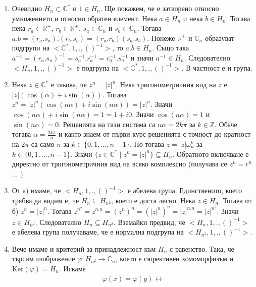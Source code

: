 \documentclass[12pt]{article}
\begin{document}
\begin{enumerate}[label=\alph*)]
    \item Очевидно \(H_n \subset \mathbb{C}^*\) и \(1 \in H_n\).
    Ще покажем, че е затворено относно умножението и относно обратен елемент.
    Нека \(a \in H_n\) и нека \(b \in H_n\). Тогава нека \(r_a \in \mathbb{R}^+\),
    \(r_b \in \mathbb{R}^+\), \(s_a \in \mathbb{C}_n\) и \(s_b \in \mathbb{C}_n\).
    Тогава \(a.b = (r_a.s_a).(r_b.s_b) = (r_a.r_b)(s_a.s_b)\). Понеже \(\mathbb{R}^+\) и \(\mathbb{C}_n\) образуват подгрупи на \(<\mathbb{C}^*, 1, ., ()^{-1}>\),
    то \(a.b \in H_n\). Също така \(a^{-1} = (r_a.s_a)^{-1} = s_a^{-1}.r_a^{-1} = r_a^{-1}.s_a^{-1}\) и значи \(a^{-1} \in H_n\). Следователно \(<H_n, 1, ., ()^{-1}>\) е подгрупа на \(<\mathbb{C}^*, 1, ., ()^{-1}>\). В частност е и група.
    \item Нека \(z \in \mathbb{C}^*\) е такова, че \(z^n = |z|^n\).
    Нека тригонометричния вид на \(z\) е \(|z|(\cos(\alpha) + i\sin(\alpha))\).
    Тогава \(z^n = |z|^n(\cos(n\alpha) + i\sin(n\alpha)) = |z|^n\).
    Значи \(\cos(n\alpha) + i\sin(n\alpha) = 1 = 1 + i0\).
    Значи \(\cos(n\alpha) = 1\) и \(\sin(n\alpha) = 0\).
    Решенията на тази система са \(n\alpha = 2k\pi\) за \(k \in \mathbb{Z}\).
    Обаче тогава \(\alpha = \displaystyle\frac{2k\pi}{n}\) и както знаем от първи курс решенията с точност до кратност на \(2\pi\) са само \(n\) за \(k \in \{0, 1, \dots, n - 1\}\). Но тогава \(z = |z|\omega_n^k\) за \(k \in \{0, 1, \dots, n - 1\}\).
    Значи \(\{z \in \mathbb{C}^* \; | \; z^n = |z|^n\} \subseteq H_n\).
    Обратното включване е директно от тригонометричния вид на всяко комплексно (получава се \(z^n = r^n\) ... )
    \item От а) имаме, че \(<H_n, 1, ., ()^{-1}>\) е абелева група. Единственото, което трябва да видим е, че \(H_n \subseteq H_{n^2}\), което е доста лесно.
    Нека \(z \in H_n\). Тогава от б) \(z^n = |z|^n\). Тогава \(z^{n^2} = z^{n.n} = (z^n)^n = (|z|^n)^n = |z|^{n.n} = |z|^{n^2}\). Значи \(z \in H_{n^2}\).
    Следователно \(H_n \subseteq H_{n^2}\). Вземайки предвид, че \(<H_n, 1, ., ()^{-1}>\) е абелева група получаваме, че е нормална подгрупа на  \(<H_{n^2}, 1, ., ()^{-1}>\).
    \item Вече имаме и критерий за принадлежност към \(H_n\) с равенство.
    Така, че търсим изображение \(\varphi : H_{n^2} \to \mathbb{C}_n\),
    което е сюрективен хомоморфизъм и \(\mathrm{Ker}(\varphi) = H_n\).
    Искаме \begin{align*}
        \varphi(x) = \varphi(y) \longleftrightarrow 

\end{align*}
\end{enumerate}
\end{document}

